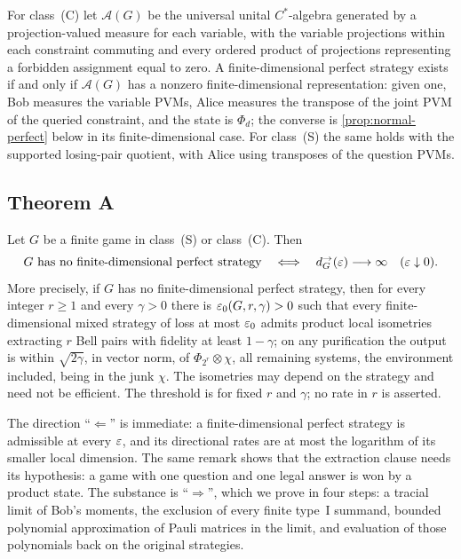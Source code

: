 For class~(C) let $\mathcal A(G)$ be the universal unital $C^*$-algebra generated by a projection-valued measure for each
variable, with the variable projections within each constraint commuting and every ordered product of projections
representing a forbidden assignment equal to zero. A finite-dimensional perfect strategy exists if and only if
$\mathcal A(G)$ has a nonzero finite-dimensional representation: given one, Bob measures the variable PVMs, Alice
measures the transpose of the joint PVM of the queried constraint, and the state is $\Phi_d$; the converse is
\cref{prop:normal-perfect} below in its finite-dimensional case. For class~(S) the same holds with the supported
losing-pair quotient, with Alice using transposes of the question PVMs.

\subsection{Theorem A}\label{sec:theoremA}

\begin{theorem}[Theorem A]\label{thm:A}
Let $G$ be a finite game in class~(S) or class~(C). Then
\[
G\text{ has no finite-dimensional perfect strategy}\quad\Longleftrightarrow\quad d_G^\to(\varepsilon)\longrightarrow\infty\quad
(\varepsilon\downarrow0).
\]
More precisely, if $G$ has no finite-dimensional perfect strategy, then for every integer $r\ge1$ and every $\gamma>0$ there
is $\varepsilon_0(G,r,\gamma)>0$ such that every finite-dimensional mixed strategy of loss at most $\varepsilon_0$ admits product local
isometries extracting $r$ Bell pairs with
fidelity at least $1-\gamma$; on any purification the output is within $\sqrt{2\gamma}$, in vector norm, of
$\Phi_{2^r}\otimes\chi$, all remaining systems, the environment included, being in the junk $\chi$. The isometries may
depend on the strategy and need not be efficient. The threshold is for fixed $r$ and $\gamma$; no rate in $r$ is asserted.
\end{theorem}

The direction ``$\Leftarrow$'' is immediate: a finite-dimensional perfect strategy is admissible at every $\varepsilon$, and its
directional rates are at most the logarithm of its smaller local dimension. The same remark shows that the extraction clause
needs its hypothesis: a game with one question and one legal answer is won by a product state. The substance is
``$\Rightarrow$'', which we
prove in four steps: a tracial limit of Bob's moments, the exclusion of every finite type~I summand, bounded polynomial
approximation of Pauli matrices in the limit, and evaluation of those polynomials back on the original strategies.

